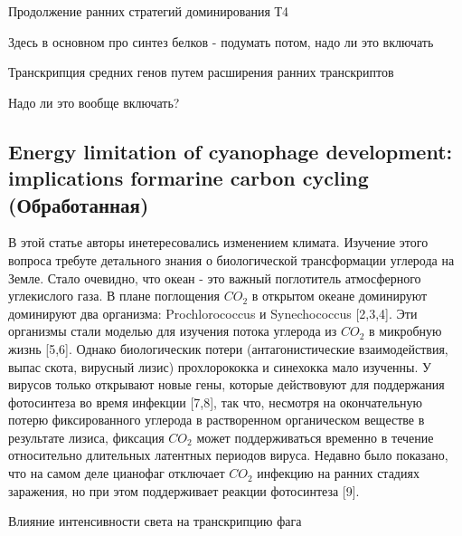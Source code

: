 \documentclass[14pt]{extarticle}
\begin{document}
        \begin{center}
            \item {\Large Продолжение ранних стратегий доминирования Т4}
            \par{Здесь в основном про синтез белков - подумать потом, надо ли это включать}
        \end{center}
        
        \begin{center}
            \item {\Large Транскрипция средних генов путем расширения ранних транскриптов}
            \par{Надо ли это вообще включать?}
        \end{center}
        
        
\begin{center}
    \item \subsection{Energy limitation of cyanophage development: implications formarine carbon cycling (Обработанная)}
\end{center}
    
    \par{В этой статье авторы инетересовались изменением климата. Изучение этого вопроса требуте детального знания о
    биологической трансформации углерода на Земле. Стало очевидно, что океан - это важный поглотитель
    атмосферного углекислого газа. В плане поглощения $CO_2$ в открытом океане доминируют доминируют два организма: 
    Prochlorococcus и Synechococcus [2,3,4]. Эти организмы стали моделью для изучения потока углерода из $CO_2$ в 
    микробную жизнь [5,6]. Однако биологическик потери (антагонистические взаимодействия, выпас скота, вирусный лизис) 
    прохлорококка и синехокка мало изученны. У вирусов только открывают новые гены, которые действовуют для поддержания 
    фотосинтеза во время инфекции [7,8], так что, несмотря на окончательную потерю фиксированного углерода в 
    растворенном органическом веществе в результате лизиса, фиксация $CO_2$ может поддерживаться временно в течение 
    относительно длительных латентных периодов вируса. Недавно было показано, что на самом деле цианофаг отключает 
    $CO_2$ инфекцию на ранних стадиях заражения, но при этом поддерживает реакции фотосинтеза [9].}
    
    \begin{center}
        \item {\Large Влияние интенсивности света на транскрипцию фага}
    \end{center}
\end{document}
